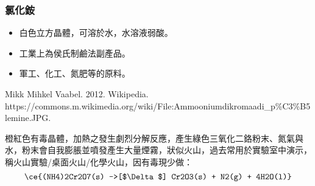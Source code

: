 \documentclass[a4paper,12pt]{report}
\begin{document}
\subsubsection{氯化銨}
\begin{itemize}
\item 白色立方晶體，可溶於水，水溶液弱酸。
\item 工業上為侯氏制鹼法副產品。
\item 軍工、化工、氮肥等的原料。
\end{itemize}
\bct\bfH\ctr{}\caption{Mikk Mihkel Vaabel. 2012. Wikipedia. \\
https://commons.m.wikimedia.org/wiki/File:Ammooniumdikromaadi\_p\%C3\%B5lemine.JPG.}\ef\FB\ect
橙紅色有毒晶體，加熱之發生劇烈分解反應，產生綠色三氧化二鉻粉末、氮氣與水，粉末會自我膨脹並噴發產生大量煙霧，狀似火山，過去常用於實驗室中演示，稱火山實驗/桌面火山/化學火山，因有毒現少做：
\[\ce{(NH4)2Cr2O7(s) ->[$\Delta$] Cr2O3(s) + N2(g) + 4H2O(l)}\]
\end{document}
